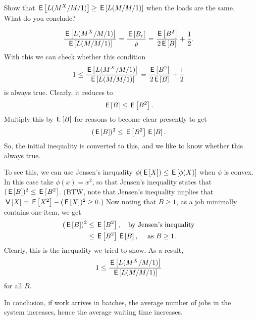 \begin{exercise}
  Show that $\,\mathsf{E}\left[L(M^X/M/1)\right] \geq \,\mathsf{E}\left[L(M/M/1)\right]$ when the loads are the
    same. What do you conclude?
  \begin{solution}
    \begin{equation*}
    \frac{\,\mathsf{E}\left[L(M^X/M/1)\right]}{\,\mathsf{E}\left[L(M/M/1)\right]} = \frac{\,\mathsf{E}\left[B_r\right]}{\rho} = 
\frac{\,\mathsf{E}\left[B^2\right]}{2\,\mathsf{E}\left[B\right]} + \frac 12.
    \end{equation*}
With this we can check whether this condition
    \begin{equation*}
    1\leq \frac{\,\mathsf{E}\left[L(M^X/M/1)\right]}{\,\mathsf{E}\left[L(M/M/1)\right]} = \frac{\,\mathsf{E}\left[B^2\right]}{2\,\mathsf{E}\left[B\right]} + \frac 12
    \end{equation*}
    is always true. Clearly, it reduces to
\begin{equation*}
\,\mathsf{E}\left[B\right] \leq  \,\mathsf{E}\left[B^2\right].
\end{equation*}
Multiply this by $\,\mathsf{E}\left[B\right]$ for reasons to become clear presently to get
\begin{equation*}
(\,\mathsf{E}\left[B\right])^2 \leq  \,\mathsf{E}\left[B^2\right] \,\mathsf{E}\left[B\right].
\end{equation*}
So, the initial inequality is converted to this, and we like to know
whether this always true.


To see this, we can use Jensen's inequality
$\phi(\,\mathsf{E}\left[X\right]) \leq \,\mathsf{E}\left[\phi(X)\right]$ when $\phi$ is convex. In this case take
$\phi(x)=x^2$, so that Jensen's inequality states that
$(\,\mathsf{E}\left[B\right])^2 \leq \,\mathsf{E}\left[B^2\right]$. (BTW, note that Jensen's inequality implies
that $\,\mathsf{V}\left[X\right] = \,\mathsf{E}\left[X^2\right] - (\,\mathsf{E}\left[X\right])^2\geq 0$.)  Now noting that $B\geq 1$, as a
job minimally contains one item, we get
\begin{equation*}
  \begin{split}
(\,\mathsf{E}\left[B\right])^2 
&\leq  \,\mathsf{E}\left[B^2\right], \quad{\text{by Jensen's inequality}} \\
&\leq   \,\mathsf{E}\left[B^2\right] \,\mathsf{E}\left[B\right], \quad{\text{ as } B \geq 1}.
  \end{split}
\end{equation*}
Clearly, this is the inequality we tried to show. As a result,
    \begin{equation*}
    1\leq \frac{\,\mathsf{E}\left[L(M^X/M/1)\right]}{\,\mathsf{E}\left[L(M/M/1)\right]}
    \end{equation*}
for all $B$. 

In conclusion, if work arrives in batches, the average number of jobs
in the system increases, hence the average waiting time increases.
  \end{solution}
\end{exercise}



